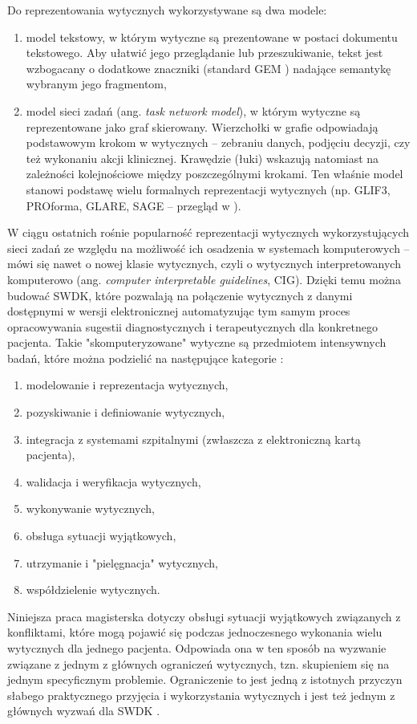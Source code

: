 Do reprezentowania wytycznych wykorzystywane są dwa modele:
\begin{enumerate}
\item model tekstowy, w którym wytyczne są prezentowane w postaci dokumentu tekstowego. Aby ułatwić jego przeglądanie lub przeszukiwanie, tekst jest wzbogacany o dodatkowe znaczniki (standard GEM \cite{Karras00}) nadające semantykę wybranym jego fragmentom,
\item model sieci zadań (ang. \textit{task network model}), w którym wytyczne są reprezentowane jako graf skierowany. Wierzchołki w grafie odpowiadają podstawowym krokom w wytycznych -- zebraniu danych, podjęciu decyzji, czy też wykonaniu akcji klinicznej. Krawędzie (łuki) wskazują natomiast na zależności kolejnościowe między poszczególnymi krokami. Ten właśnie model stanowi podstawę wielu formalnych reprezentacji wytycznych (np. GLIF3, PROforma, GLARE, SAGE \cite{Peleg} -- przegląd w \cite{Peleg2013}).
\end{enumerate}

W ciągu ostatnich rośnie popularność reprezentacji wytycznych wykorzystujących sieci zadań ze względu na możliwość ich osadzenia w systemach komputerowych -- mówi się nawet o nowej klasie wytycznych, czyli o wytycznych interpretowanych komputerowo (ang. \textit{computer interpretable guidelines}, CIG). Dzięki temu można budować SWDK, które pozwalają na połączenie wytycznych z danymi dostępnymi w wersji elektronicznej automatyzując tym samym proces opracowywania sugestii diagnostycznych i terapeutycznych dla konkretnego pacjenta. Takie "skomputeryzowane" wytyczne są przedmiotem intensywnych badań, które można podzielić na następujące kategorie \cite{Peleg2013}:
\begin{enumerate}
\item modelowanie i reprezentacja wytycznych,
\item pozyskiwanie i definiowanie wytycznych,
\item integracja z systemami szpitalnymi (zwłaszcza z elektroniczną kartą pacjenta),
\item walidacja i weryfikacja wytycznych,
\item wykonywanie wytycznych,
\item obsługa sytuacji wyjątkowych,
\item utrzymanie i "pielęgnacja" wytycznych,
\item współdzielenie wytycznych.
\end{enumerate}

Niniejsza praca magisterska dotyczy obsługi sytuacji wyjątkowych związanych z konfliktami, które mogą pojawić się podczas jednoczesnego wykonania wielu wytycznych dla jednego pacjenta. Odpowiada ona w ten sposób na wyzwanie związane z jednym z głównych ograniczeń wytycznych, tzn. skupieniem się na jednym specyficznym problemie. Ograniczenie to jest jedną z istotnych przyczyn słabego praktycznego przyjęcia i wykorzystania wytycznych \cite{Peleg2013} i jest też jednym z głównych wyzwań dla SWDK \cite{Sittig08}.

